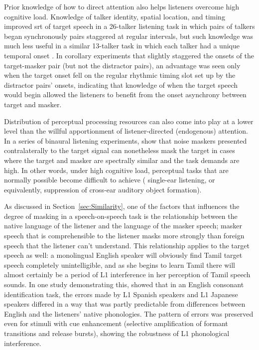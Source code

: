 Prior knowledge of how to direct attention also helps listeners overcome high cognitive load.  Knowledge of talker identity, spatial location, and timing improved \ac{srt} of target speech in a 26-talker listening task in which pairs of talkers began synchronously pairs staggered at regular intervals, but such knowledge was much less useful in a similar 13-talker task in which each talker had a unique temporal onset \citep{KitterickEtAl2010}.  In corollary experiments that slightly staggered the onsets of the target-masker pair (but not the distractor pairs), an advantage was seen only when the target onset fell on the regular rhythmic timing slot set up by the distractor pairs’ onsets, indicating that knowledge of when the target speech would begin allowed the listeners to benefit from the onset asynchrony between target and masker.

Distribution of perceptual processing resources can also come into play at a lower level than the willful apportionment of listener-directed (endogenous) attention.  In a series of binaural listening experiments, \citet{GallunEtAl2007} show that noise maskers presented contralaterally to the target signal can nonetheless mask the target in cases where the target and masker are spectrally similar and the task demands are high.  In other words, under high cognitive load, perceptual tasks that are normally possible become difficult to achieve (\eg{} single-ear listening, or equivalently, suppression of cross-ear auditory object formation).  %


As discussed in Section~\ref{sec:Similarity}, one of the factors that influences the degree of masking in a speech-on-speech task is the relationship between the native language of the listener and the language of the masker speech; masker speech that is comprehensible to the listener masks more strongly than foreign speech that the listener can’t understand.  This relationship applies to the target speech as well: a monolingual English speaker will obviously find Tamil target speech completely unintelligible, and as she begins to learn Tamil there will almost certainly be a period of L1 interference in her perception of Tamil speech sounds.  In one study demonstrating this, \citet{HazanSimpson2000} showed that in an English consonant identification task, the errors made by L1 Spanish speakers and L1 Japanese speakers differed in a way that was partly predictable from differences between English and the listeners’ native phonologies.  The pattern of errors was preserved even for stimuli with cue enhancement (selective amplification of formant transitions and release bursts), showing the robustness of L1 phonological interference.

